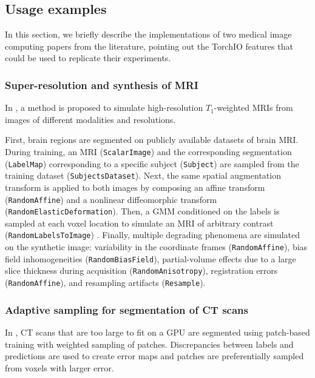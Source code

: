 \subsection{Usage examples}

In this section, we briefly describe the implementations of two medical image computing papers from the literature, pointing out the TorchIO features that could be used to replicate their experiments.


\subsubsection{Super-resolution and synthesis of MRI}

In \cite{iglesias_joint_2020}, a method is proposed to simulate high-resolution $T_1$-weighted \acp{MRI} from images of different modalities and resolutions.

First, brain regions are segmented on publicly available datasets of brain \ac{MRI}.
During training, an \ac{MRI} (\texttt{ScalarImage}) and the corresponding segmentation (\texttt{LabelMap}) corresponding to a specific subject (\texttt{Subject}) are sampled from the training dataset (\texttt{SubjectsDataset}).
Next, the same spatial augmentation transform is applied to both images by composing an affine transform (\texttt{RandomAffine}) and a nonlinear diffeomorphic transform (\texttt{RandomElasticDeformation}).
Then, a \ac{GMM} conditioned on the labels is sampled at each voxel location to simulate an \ac{MRI} of arbitrary contrast (\texttt{RandomLabelsToImage}) \cite{billot_learning_2020}.
Finally, multiple degrading phenomena are simulated on the synthetic image: variability in the coordinate frames (\texttt{RandomAffine}), bias field inhomogeneities (\texttt{RandomBiasField}),
partial-volume effects due to a large slice thickness during acquisition \cite{billot_partial_2020} (\texttt{RandomAnisotropy}), registration errors (\texttt{RandomAffine}), and resampling artifacts (\texttt{Resample}).


\subsubsection{Adaptive sampling for segmentation of CT scans}

In \cite{berger_adaptive_2018}, \ac{CT} scans that are too large to fit on a \ac{GPU} are segmented using patch-based training with weighted sampling of patches.
Discrepancies between labels and predictions are used to create error maps and patches are preferentially sampled from voxels with larger error.

